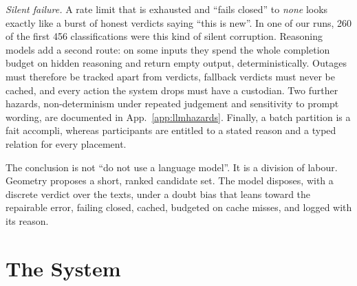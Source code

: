 \documentclass{article}
\begin{document}
\emph{Silent failure.} A rate limit that is exhausted and ``fails closed'' to \emph{none} looks exactly like a burst of honest verdicts saying ``this is new''. In one of our runs, 260 of the first 456 classifications were this kind of silent corruption. Reasoning models add a second route: on some inputs they spend the whole completion budget on hidden reasoning and return empty output, deterministically. Outages must therefore be tracked apart from verdicts, fallback verdicts must never be cached, and every action the system drops must have a custodian. Two further hazards, non-determinism under repeated judgement and sensitivity to prompt wording, are documented in App.~\ref{app:llmhazards}. Finally, a batch partition is a fait accompli, whereas participants are entitled to a stated reason and a typed relation for every placement.

The conclusion is not ``do not use a language model''. It is a division of labour. Geometry proposes a short, ranked candidate set. The model disposes, with a discrete verdict over the texts, under a doubt bias that leans toward the repairable error, failing closed, cached, budgeted on cache misses, and logged with its reason.

\section{The System}
\label{sec:system}
\end{document}
